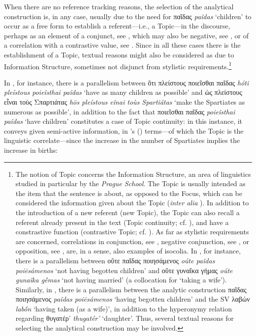 \documentclass[output=paper,colorlinks,citecolor=brown]{langscibook}
\begin{document}
When there are no reference tracking reasons, the selection of the analytical construction is, in any case, usually due to the need for παῖδας \textit{paîdas} `children' to occur as a free form to establish a referent---i.e., a Topic---in the discourse, perhaps as an element of a conjunct, see , which may also be negative, see , or of a correlation with a contrastive value, see . Since in all these cases there is the establishment of a Topic, textual reasons might also be considered as due to Information Structure, sometimes not disjunct from stylistic requirements.\largerpage[1.5]\footnote{The notion of Topic concerns the Information Structure, an area of linguistics studied in particular by the \textit{Prague School}. The Topic is usually intended as the item that the sentence is about, as opposed to the Focus, which can be considered the information given about the Topic (\textit{inter alia} \citealt{Lambrecht1994}). In addition to the introduction of a new referent (new Topic), the Topic can also recall a referent already present in the text (Topic continuity; cf. \citealt{Givón1983}), and have a constrastive function (contrastive Topic; cf. \citealt{Buring1999}). As far as stylistic requirements are concerned, correlations in conjunction, see , negative conjunction, see , or opposition, see , are, in a sense, also examples of isocolia. In , for instance, there is a parallelism between οὔτε παῖδας ποιησάμενος \textit{oúte paîdas poiēsámenos} `not having begotten children' and οὔτε γυναῖκα γήμας \textit{oúte gunaîka gḗmas} `not having married' (a collocation for `taking a wife'). Similarly, in , there is a parallelism between the analytic construction παῖδας ποιησάμενος \textit{paîdas poiēsámenos} `having begotten children' and the SV λαβών \textit{labṓn} `having taken (as a wife)', in addition to the hyperonymy relation regarding θυγατέρ' \textit{thugatér'} `daughter'. Thus, several textual reasons for selecting the analytical construction may be involved.} 


In , for instance, there is a parallelism between ὅτι πλείστους ποιεῖσθαι παῖδας \textit{hóti pleístous poieîsthai paîdas} `have as many children as possible' and ὡς πλείστους εἶναι τοὺς Σπαρτιάτας \textit{hōs pleístous eînai toùs Spartiátas} `make the Spartiates as numerous as possible', in addition to the fact that ποιεῖσθαι παῖδας \textit{poieîsthai paîdas} `have children' constitutes a case of Topic continuity: in this instance, it conveys given semi-active information, in \citeauthor{Chafe1987}'s (\citeyear{Chafe1987}) terms---of which the Topic is the linguistic correlate---since the increase in the number of Spartiates implies the increase in births: 
\end{document}
